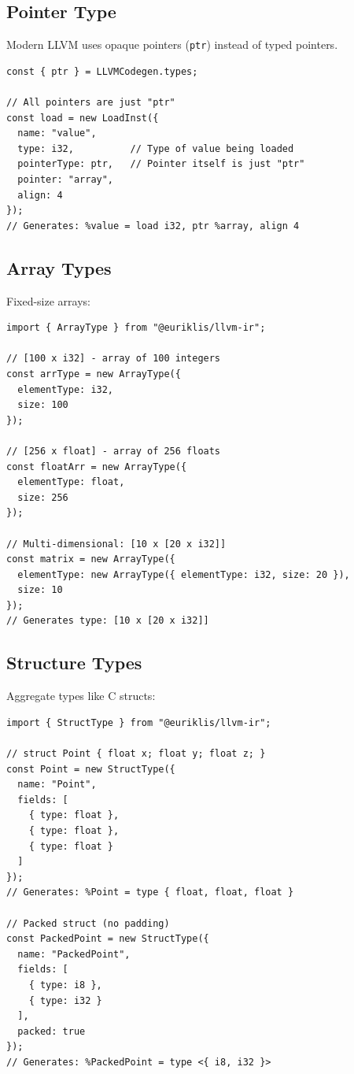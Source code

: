 \documentclass[11pt]{article}
\begin{document}
\subsection{Pointer Type}

Modern LLVM uses opaque pointers (\texttt{ptr}) instead of typed pointers.

\begin{lstlisting}[style=ts]
const { ptr } = LLVMCodegen.types;

// All pointers are just "ptr"
const load = new LoadInst({
  name: "value",
  type: i32,          // Type of value being loaded
  pointerType: ptr,   // Pointer itself is just "ptr"
  pointer: "array",
  align: 4
});
// Generates: %value = load i32, ptr %array, align 4
\end{lstlisting}

\subsection{Array Types}

Fixed-size arrays:

\begin{lstlisting}[style=ts]
import { ArrayType } from "@euriklis/llvm-ir";

// [100 x i32] - array of 100 integers
const arrType = new ArrayType({
  elementType: i32,
  size: 100
});

// [256 x float] - array of 256 floats
const floatArr = new ArrayType({
  elementType: float,
  size: 256
});

// Multi-dimensional: [10 x [20 x i32]]
const matrix = new ArrayType({
  elementType: new ArrayType({ elementType: i32, size: 20 }),
  size: 10
});
// Generates type: [10 x [20 x i32]]
\end{lstlisting}

\subsection{Structure Types}

Aggregate types like C structs:

\begin{lstlisting}[style=ts]
import { StructType } from "@euriklis/llvm-ir";

// struct Point { float x; float y; float z; }
const Point = new StructType({
  name: "Point",
  fields: [
    { type: float },
    { type: float },
    { type: float }
  ]
});
// Generates: %Point = type { float, float, float }

// Packed struct (no padding)
const PackedPoint = new StructType({
  name: "PackedPoint",
  fields: [
    { type: i8 },
    { type: i32 }
  ],
  packed: true
});
// Generates: %PackedPoint = type <{ i8, i32 }>
\end{lstlisting}
\end{document}
